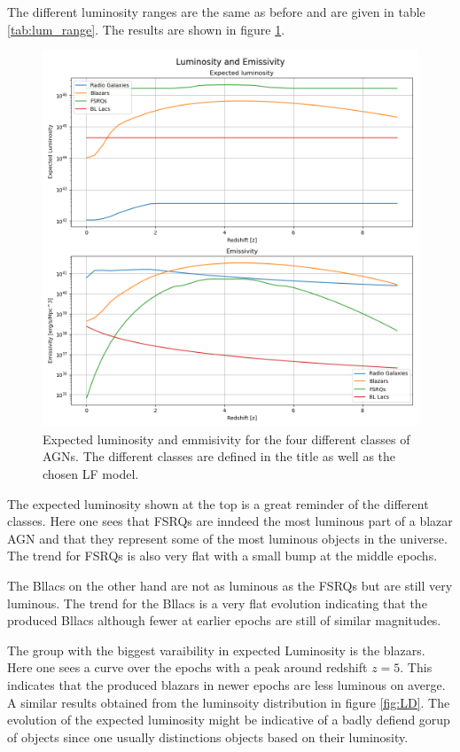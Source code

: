 \documentclass{article}
\begin{document}
The different luminosity ranges are the same as before and are given in table \ref{tab:lum_range}. The results are shown in figure \ref{fig:EL}.

\begin{figure}
    \centering
    \includegraphics[width = \textwidth]{Luminosity and Emissivity.png}
    \caption{Expected luminosity and emmisivity for the four different classes of AGNs. The different classes are defined in the title as well as the chosen LF model.}
    \label{fig:EL}
\end{figure}

The expected luminosity shown at the top is a great reminder of the different classes. Here one sees that FSRQs are inndeed the most luminous part of a blazar AGN and 
that they represent some of the most luminous objects in the universe. The trend for FSRQs is also very flat with a small bump at the middle epochs. 

The Bllacs on the other hand are not as luminous as the FSRQs but are still very luminous. 
The trend for the Bllacs is a very flat evolution indicating that the produced Bllacs although fewer at earlier epochs are still 
of similar magnitudes.

The group with the biggest varaibility in expected Luminosity is the blazars. Here one sees a curve over the epochs with a peak around redshift $z=5$. 
This indicates that the produced blazars in newer epochs are less luminous on averge. A similar results obtained from the luminsoity distribution in figure \ref{fig:LD}.
The evolution of the expected luminosity might be indicative of a badly defiend gorup of objects since one usually distinctions objects based on their luminosity.
\end{document}
